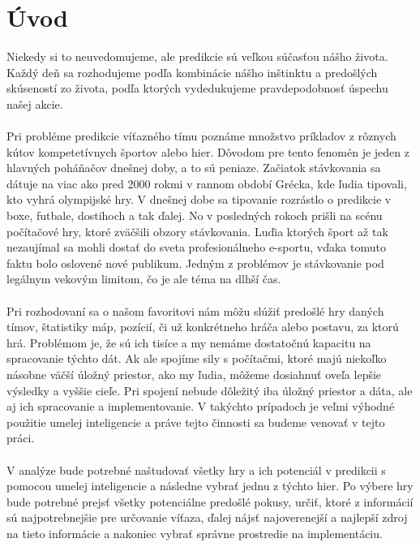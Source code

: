 
{}

\chapter*{Úvod}


Niekedy si to neuvedomujeme, ale predikcie sú veľkou súčasťou nášho života. Každý deň sa rozhodujeme podľa kombinácie nášho inštinktu a predošlých skúseností zo života, podľa ktorých vydedukujeme pravdepodobnosť úspechu našej akcie. 
\\ \\
Pri probléme predikcie víťazného tímu poznáme množstvo príkladov z rôznych kútov kompetetívnych športov alebo hier. Dôvodom pre tento fenomén je jeden z hlavných poháňačov dnešnej doby, a to sú peniaze. Začiatok stávkovania sa dátuje na viac ako pred 2000 rokmi v rannom období Grécka, kde ľudia tipovali, kto vyhrá olympijské hry. V dnešnej dobe sa tipovanie rozrástlo o predikcie v boxe, futbale, dostihoch a tak ďalej. No v posledných rokoch prišli na scénu počítačové hry, ktoré zväčšili obzory stávkovania. Luďia ktorých šport až tak nezaujímal sa mohli dostať do sveta profesionálneho e-sportu, vďaka tomuto faktu bolo oslovené nové publikum. Jedným z problémov je stávkovanie pod legálnym vekovým limitom, čo je ale téma na dlhší čas. 
\\ \\
Pri rozhodovaní sa o našom favoritovi nám môžu slúžiť predošlé hry daných tímov, štatistiky máp, pozícií, či už konkrétneho hráča alebo postavu, za ktorú hrá. Problémom je, že sú ich tisíce a my nemáme dostatočnú kapacitu na spracovanie týchto dát. Ak ale spojíme sily s počítačmi, ktoré majú niekoľko násobne väčší úložný priestor, ako my ľudia, môžeme dosiahnuť oveľa lepšie výsledky a vyššie cieľe. Pri spojení nebude dôležitý iba úložný priestor a dáta, ale aj ich spracovanie a implementovanie. V takýchto prípadoch je veľmi výhodné použitie umelej inteligencie a práve tejto činnosti sa budeme venovať v tejto práci. 
\\ \\
V analýze bude potrebné naštudovať všetky hry a ich potenciál v predikcii s pomocou umelej inteligencie a následne vybrať jednu z týchto hier. Po výbere hry bude potrebné prejsť všetky potenciálne predošlé pokusy, určiť, ktoré z informácií sú najpotrebnejšie pre určovanie víťaza, ďalej nájsť najoverenejší a najlepší zdroj na tieto informácie a nakoniec vybrať správne prostredie na implementáciu.

